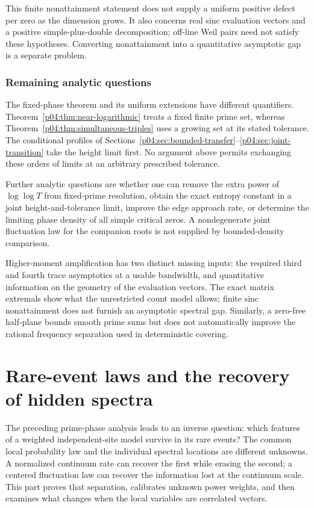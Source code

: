 \documentclass[11pt,letterpaper]{article}
\theoremstyle{definition}
\theoremstyle{remark}
\newcommand{\1}{\mathbf 1}
\begin{document}
This finite nonattainment statement does not supply a uniform
positive defect per zero as the dimension grows. It also concerns
real sinc evaluation vectors and a positive simple-plus-double
decomposition; off-line Weil pairs need not satisfy these
hypotheses. Converting nonattainment into a quantitative
asymptotic gap is a separate problem.




\section{Remaining analytic questions}

The fixed-phase theorem and its uniform extensions have different
quantifiers. Theorem~\ref{p04:thm:near-logarithmic} treats a fixed
finite prime set, whereas Theorem~\ref{p04:thm:simultaneous-triples}
uses a growing set at its stated tolerance. The conditional profiles
of Sections~\ref{p04:sec:bounded-transfer}--\ref{p04:sec:joint-transition}
take the height limit first. No argument above permits exchanging
these orders of limits at an arbitrary prescribed tolerance.

Further analytic questions are whether one can remove the extra
power of $\log\log T$ from fixed-prime resolution, obtain the exact
entropy constant in a joint height-and-tolerance limit, improve the
edge approach rate, or determine the limiting phase density of all
simple critical zeros. A nondegenerate joint fluctuation law for
the companion roots is not supplied by bounded-density comparison.

Higher-moment amplification has two distinct missing inputs: the
required third and fourth trace asymptotics at a usable bandwidth,
and quantitative information on the geometry of the evaluation
vectors. The exact matrix extremals show what the unrestricted
count model allows; finite sinc nonattainment does not furnish an
asymptotic spectral gap. Similarly, a zero-free half-plane bounds
smooth prime sums but does not automatically improve the rational
frequency separation used in deterministic covering.


\clearpage

\part{Rare-event laws and the recovery of hidden spectra}
\label{part:rare-events}The preceding prime-phase analysis leads to an inverse question: which
features of a weighted independent-site model survive in its rare events?
The common local probability law and the individual spectral locations
are different unknowns. A normalized continuum rate can recover the
first while erasing the second; a centered fluctuation law can recover
the information lost at the continuum scale. This part proves that
separation, calibrates unknown power weights, and then examines what
changes when the local variables are correlated vectors.
\end{document}

